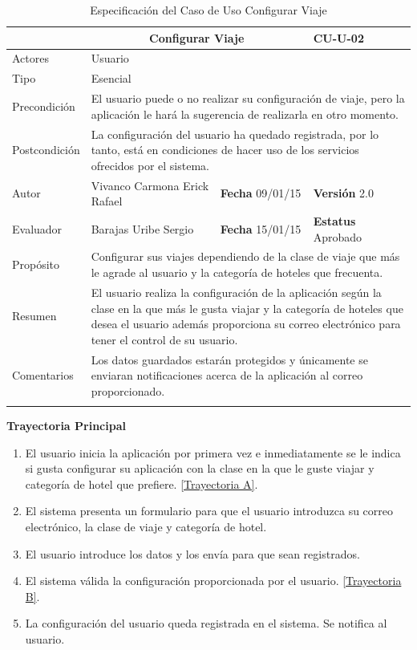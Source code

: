 \begin{longtable}[h]{|p{2.5cm}|p{6.4cm}|p{2cm}|p{2cm}|}
	\hline
		\rowcolor[RGB]{51,153,255}{Caso de Uso}&\multicolumn{2}{c}{Configurar Viaje}&{\textbf{CU-U-02}}\\
	\hline
		{Actores}&\multicolumn{3}{p{11.2cm}|}{Usuario}\\
	\hline
		{Tipo}&\multicolumn{3}{p{11.2cm}|}{Esencial}\\
	\hline
		{Precondición}&\multicolumn{3}{p{11.2cm}|}{El usuario puede o no realizar su configuración de viaje, pero la aplicación le hará la sugerencia de realizarla en otro momento.}\\
	\hline
		{Postcondición}&\multicolumn{3}{p{11.2cm}|}{La configuración del usuario ha quedado registrada, por lo tanto, está en condiciones de hacer uso de los servicios ofrecidos por el sistema.}\\
	\hline
		{Autor}&{Vivanco Carmona Erick Rafael}&{\textbf{Fecha} 09/01/15}&{\textbf{Versión} 2.0}\\
			\hline
		{Evaluador}&{Barajas Uribe Sergio}&{\textbf{Fecha} 15/01/15}&{\textbf{Estatus} Aprobado}\\
	\hline
		{Propósito}&\multicolumn{3}{p{11.2cm}|}{Configurar sus viajes dependiendo de la clase de viaje que más le agrade al usuario y la categoría de hoteles que frecuenta.}\\
	\hline
		{Resumen}&\multicolumn{3}{p{11.2cm}|}{El usuario realiza la configuración de la aplicación según la clase en la que más le gusta viajar y la categoría de hoteles que desea el usuario además proporciona su correo electrónico para tener el control de su usuario.}\\	
	\hline
		{Comentarios}&\multicolumn{3}{p{11.2cm}|}{Los datos guardados estarán protegidos y únicamente se enviaran notificaciones acerca de la aplicación al correo proporcionado.}\\	
	\hline
	\caption[Especificación del Caso de Uso Configurar Viaje]{Especificación del Caso de Uso Configurar Viaje}
    	\label{tab:cuConfigurarViaje}
\end{longtable}
\newpage
\begin{flushleft}
	\textbf{Trayectoria Principal}\\
	\begin{enumerate}
		\item El usuario inicia la aplicación por primera vez e inmediatamente se le indica si gusta configurar su aplicación con la clase en la que le guste viajar y categoría de hotel que prefiere. \hyperlink{TrayectoriaA_CU-U-02}{[Trayectoria A]}.
		\item El sistema presenta un formulario para que el usuario introduzca su correo electrónico, la clase de viaje y categoría de hotel.
		\item El usuario introduce los datos y los envía para que sean registrados.
		\item El sistema válida la configuración proporcionada por el usuario. \hyperlink{TrayectoriaB_CU-U-02}{[Trayectoria B]}.
		\item La configuración del usuario queda registrada en el sistema. Se notifica al usuario.
	\end{enumerate}
\end{flushleft}

